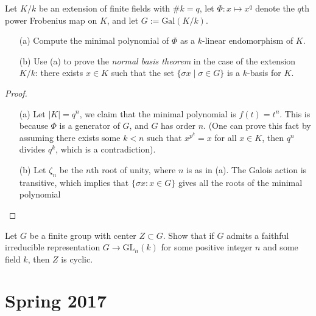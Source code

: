 \documentclass[openany]{book}
\begin{document}
\begin{prob}
    Let \(K/k\) be an extension of finite fields with \(\#k=q\), let \(\Phi\colon x\mapsto x^{q}\) denote the \(q\)th power Frobenius map on \(K\), and let \(G:=\text{Gal}(K/k)\).
    \begin{itemize}
        \item[(a)] Compute the minimal polynomial of \(\Phi\) as a \(k\)-linear endomorphism of \(K\).
        \item[(b)] Use (a) to prove the \textit{normal basis theorem} in the case of the extension \(K/k\): there exists \(x\in K\) such that the set \(\{\sigma x\mid\sigma\in G\}\) is a \(k\)-basis for \(K\).
    \end{itemize}
\end{prob}
\begin{proof}
    \begin{itemize}
        \item[(a)] Let $|K|=q^n$, we claim that the minimal polynomial is $f(t)=t^n$. This is because $\Phi$ is a generator of $G$, and $G$ has order $n$. (One can prove this fact by assuming there exists some $k<n$ such that $x^{p^k}=x$ for all $x\in K$, then $q^n$ divides $q^k$, which is a contradiction).
        \item[(b)] Let $\zeta_n$ be the $n$th root of unity, where $n$ is as in (a). The Galois action is transitive, which implies that $\{\sigma x:x\in G\}$ gives all the roots of the minimal polynomial 
    \end{itemize}
\end{proof}


\begin{prob}
    Let \(G\) be a finite group with center \(Z\subset G\). Show that if \(G\) admits a faithful irreducible representation \(G\to\text{GL}_{n}(k)\) for some positive integer \(n\) and some field \(k\), then \(Z\) is cyclic.
\end{prob}







\chapter{Spring 2017}
\end{document}
